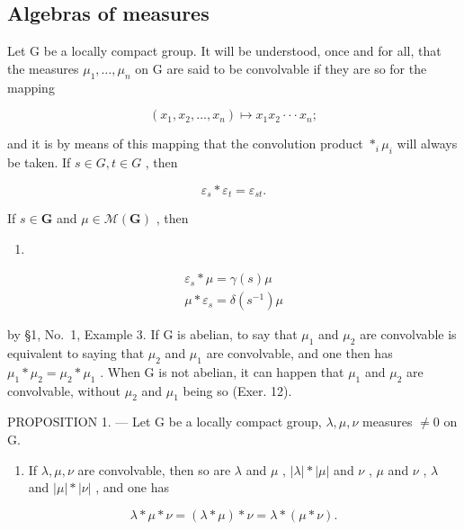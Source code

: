 \subsection{Algebras of measures}

Let G be a locally compact group. It will be understood, once and for all, that the measures \(\mu_{1},\ldots,\mu_{n}\) on G are said to be convolvable if they are so for the mapping

\[
(x _ {1}, x _ {2}, \ldots , x _ {n}) \mapsto x _ {1} x _ {2} \cdot \cdot \cdot x _ {n};
\]

and it is by means of this mapping that the convolution product \(\ast_{i}\mu_{i}\) will always be taken. If \(s\in G, t\in G\) , then

\[
\varepsilon_ {s} * \varepsilon_ {t} = \varepsilon_ {s t}.\tag{1}
\]

If \(s \in \mathbf{G}\) and \(\mu \in \mathcal{M}(\mathbf{G})\) , then

\begin{enumerate}
\def\labelenumi{(\arabic{enumi})}
\setcounter{enumi}{1}
\tightlist
\item
\end{enumerate}

\[
\begin{array}{l} \varepsilon_ {s} * \mu = \gamma (s) \mu \\ \mu * \varepsilon_ {s} = \delta (s ^ {- 1}) \mu \end{array}\tag{3}
\]

by §1, No.~1, Example 3. If G is abelian, to say that \(\mu_{1}\) and \(\mu_{2}\) are convolvable is equivalent to saying that \(\mu_{2}\) and \(\mu_{1}\) are convolvable, and one then has \(\mu_{1} * \mu_{2} = \mu_{2} * \mu_{1}\) . When G is not abelian, it can happen that \(\mu_{1}\) and \(\mu_{2}\) are convolvable, without \(\mu_{2}\) and \(\mu_{1}\) being so (Exer. 12).

PROPOSITION 1. --- Let G be a locally compact group, \(\lambda, \mu, \nu\) measures \(\neq 0\) on G.

\begin{enumerate}
\def\labelenumi{(\roman{enumi})}
\tightlist
\item
  If \(\lambda, \mu, \nu\) are convolvable, then so are \(\lambda\) and \(\mu\) , \(|\lambda| * |\mu|\) and \(\nu\) , \(\mu\) and \(\nu\) , \(\lambda\) and \(|\mu| * |\nu|\) , and one has
\end{enumerate}

\[
\lambda * \mu * \nu = (\lambda * \mu) * \nu = \lambda * (\mu * \nu).
\]

